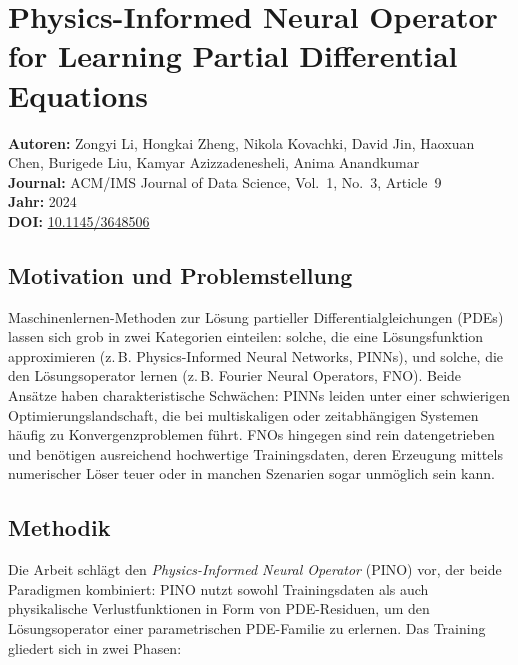 \documentclass[a4paper,12pt]{article}
\begin{document}
\section*{Physics-Informed Neural Operator for Learning Partial Differential Equations}

\textbf{Autoren:} Zongyi Li, Hongkai Zheng, Nikola Kovachki, David Jin, Haoxuan Chen,
Burigede Liu, Kamyar Azizzadenesheli, Anima Anandkumar \\
\textbf{Journal:} ACM/IMS Journal of Data Science, Vol.~1, No.~3, Article~9 \\
\textbf{Jahr:} 2024 \\
\textbf{DOI:} \href{https://doi.org/10.1145/3648506}{10.1145/3648506}

\subsection*{Motivation und Problemstellung}

Maschinenlernen-Methoden zur Lösung partieller Differentialgleichungen (PDEs) lassen sich
grob in zwei Kategorien einteilen: solche, die eine Lösungsfunktion approximieren (z.\,B.
Physics-Informed Neural Networks, PINNs), und solche, die den Lösungsoperator lernen
(z.\,B. Fourier Neural Operators, FNO). Beide Ansätze haben charakteristische Schwächen:
PINNs leiden unter einer schwierigen Optimierungslandschaft, die bei multiskaligen oder
zeitabhängigen Systemen häufig zu Konvergenzproblemen führt. FNOs hingegen sind rein
datengetrieben und benötigen ausreichend hochwertige Trainingsdaten, deren Erzeugung
mittels numerischer Löser teuer oder in manchen Szenarien sogar unmöglich sein kann.

\subsection*{Methodik}

Die Arbeit schlägt den \textit{Physics-Informed Neural Operator} (PINO) vor, der beide
Paradigmen kombiniert: PINO nutzt sowohl Trainingsdaten als auch physikalische
Verlustfunktionen in Form von PDE-Residuen, um den Lösungsoperator einer parametrischen
PDE-Familie zu erlernen. Das Training gliedert sich in zwei Phasen:
\end{document}
